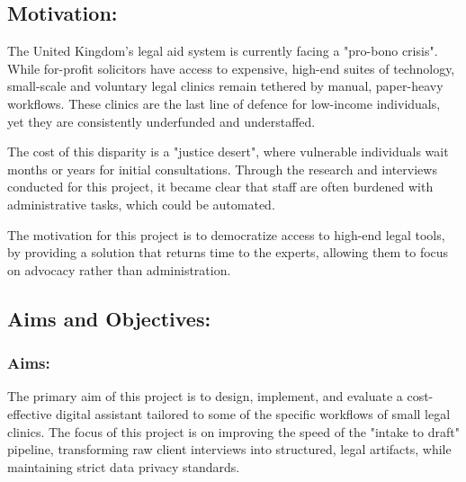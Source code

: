 \documentclass[11pt,a4paper]{article}
\begin{document}
\subsection{Motivation:}

The United Kingdom's legal aid system is currently facing a "pro-bono crisis". While for-profit solicitors have access to expensive, high-end suites of technology, small-scale and voluntary legal clinics remain tethered by manual, paper-heavy workflows. These clinics are the last line of defence for low-income individuals, yet they are consistently underfunded and understaffed. \par

The cost of this disparity is a "justice desert", where vulnerable individuals wait months or years for initial consultations. Through the research and interviews conducted for this project, it became clear that staff are often burdened with administrative tasks, which could be automated. \par

The motivation for this project is to democratize access to high-end legal tools, by providing a solution that returns time to the experts, allowing them to focus on advocacy rather than administration.

\subsection{Aims and Objectives:}

\subsubsection{Aims:}
The primary aim of this project is to design, implement, and evaluate a cost-effective digital assistant tailored to some of the specific workflows of small legal clinics. The focus of this project is on improving the speed of the "intake to draft" pipeline, transforming raw client interviews into structured, legal artifacts, while maintaining strict data privacy standards.
\end{document}
